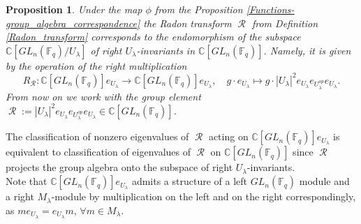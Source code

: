 \documentclass[12pt,reqno]{amsart}
\newtheorem{prop}[thm]{Proposition}
\theoremstyle{definition}
\theoremstyle{remark}
\numberwithin{equation}{section}
\newcommand{\CC}{\mathbb{C}}
\newcommand{\GL}[1]{GL_{#1}(\mathbb{F}_q)}
\DeclareMathOperator{\R}{\mathcal{R}}
\def\IM#1{\textcolor[rgb]{0.00,0.00,0.75}{[I: #1]}}
\begin{document}

\begin{prop}\label{Radon Expansion}
    Under the map $\phi$ from the Proposition \ref{Functions-group_algebra_correspondence} the Radon transform $\R$ from Definition \ref{Radon_transform} corresponds to the endomorphism of the subspace $\CC[\GL{n}/U_{\lambda}]$ of right $U_{\lambda}$-invariants in $\CC[\GL{n}]$. Namely, it is given by the operation of the right multiplication
    \begin{equation}
        R_{\R}: \CC[\GL{n}]e_{U_{\lambda}} \rightarrow \CC[\GL{n}]e_{U_{\lambda}}, \quad g\cdot e_{U_{\lambda}} \mapsto g\cdot |U_{\lambda}|^2e_{U_{\lambda}}e_{U_{\lambda}^{op}}e_{U_{\lambda}}.
    \end{equation}
    From now on we work with the group element $\R:=|U_{\lambda}|^2e_{U_{\lambda}}e_{U_{\lambda}^{op}}e_{U_{\lambda}} \in \CC[\GL{n}]$.
    

\end{prop}

The classification of nonzero eigenvalues of $\R$ acting on $\CC[\GL{n}]e_{U_{\lambda}}$ is equivalent to classification of eigenvalues of $\R$ on $\CC[\GL{n}]$ since $\R$ projects the group algebra onto the subspace of right $U_{\lambda}$-invariants.\\

Note that $\CC[\GL{n}]e_{U_{\lambda}}$ admits a structure of a left $\GL{n}$ module and a right $M_{\lambda}$-module by multiplication on the left and on the right correspondingly, as $m e_{U_{\lambda}}=e_{U_{\lambda}} m$, $\forall m\in M_{\lambda}$.
\end{document}
